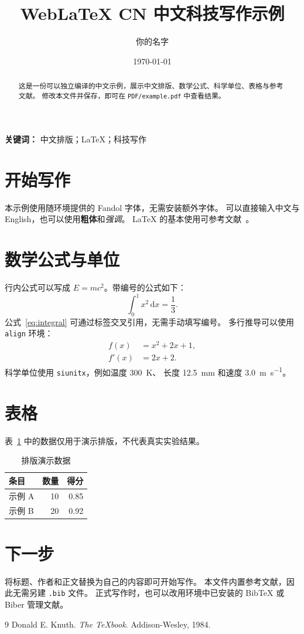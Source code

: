 \documentclass[UTF8,fontset=fandol,a4paper,11pt]{ctexart}
\title{WebLaTeX CN 中文科技写作示例}
\author{你的名字}
\date{\today}
\begin{document}
\maketitle

\begin{abstract}
这是一份可以独立编译的中文示例，展示中文排版、数学公式、科学单位、表格与参考文献。
修改本文件并保存，即可在 \texttt{PDF/example.pdf} 中查看结果。
\end{abstract}

\noindent\textbf{关键词：} 中文排版；LaTeX；科技写作

\section{开始写作}
本示例使用随环境提供的 Fandol 字体，无需安装额外字体。
可以直接输入中文与 English，也可以使用\textbf{粗体}和\emph{强调}。
LaTeX 的基本使用可参考文献~\cite{knuth1984}。

\section{数学公式与单位}
行内公式可以写成 $E=mc^2$。带编号的公式如下：
\begin{equation}
  \int_0^1 x^2\,\mathrm{d}x = \frac{1}{3}.
  \label{eq:integral}
\end{equation}
公式~\eqref{eq:integral} 可通过标签交叉引用，无需手动填写编号。
多行推导可以使用 \texttt{align} 环境：
\begin{align}
  f(x) &= x^2 + 2x + 1, \\
  f'(x) &= 2x + 2.
\end{align}
科学单位使用 \texttt{siunitx}，例如温度 \qty{300}{\kelvin}、
长度 \qty{12.5}{\milli\metre} 和速度 \qty{3.0}{\metre\per\second}。

\section{表格}
表~\ref{tab:demo} 中的数据仅用于演示排版，不代表真实实验结果。
\begin{table}[htbp]
  \centering
  \caption{排版演示数据}
  \label{tab:demo}
  \begin{tabular}{lrr}
    \toprule
    条目 & 数量 & 得分 \\
    \midrule
    示例 A & 10 & 0.85 \\
    示例 B & 20 & 0.92 \\
    \bottomrule
  \end{tabular}
\end{table}

\section{下一步}
将标题、作者和正文替换为自己的内容即可开始写作。
本文件内置参考文献，因此无需另建 \texttt{.bib} 文件。
正式写作时，也可以改用环境中已安装的 BibTeX 或 Biber 管理文献。

\begin{thebibliography}{9}
  Donald E. Knuth.
  \emph{The TeXbook}.
  Addison-Wesley, 1984.
\end{thebibliography}
\end{document}
